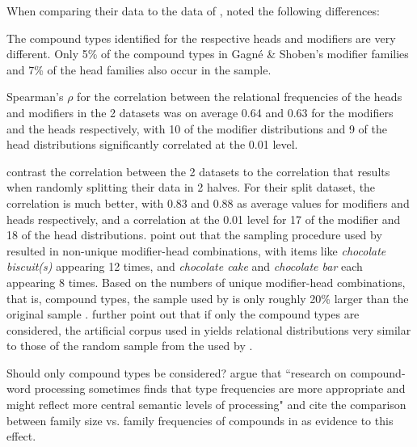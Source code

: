 When comparing their data to the data of \citet{GagneandShoben:1997},
\citet{Maguireetal:2007} noted the following differences:
\begin{inparaenum}[(1)]
\item The compound types identified for the
respective heads and modifiers are very different. Only 5\% of the
compound types in Gagné \& Shoben's modifier families and 7\% of the
head families also  occur in the  sample.
\item Spearman's $\rho$ for the correlation between the relational frequencies of the heads and modifiers
in the 2 datasets was on average 0.64 and 0.63 for the modifiers and
the heads respectively, with 10 of the modifier distributions and 9
of the head distributions significantly correlated at the 0.01
level. 
\end{inparaenum}
\citet{Maguireetal:2007} contrast the correlation between the 2
datasets to the correlation that results when randomly splitting their
 data in 2 halves. For their split dataset, the
correlation is much better, with 0.83 and 0.88 as average values for
modifiers and heads respectively, and a correlation at the 0.01 level
for 17 of the modifier and 18 of the head
distributions. \citet{SpaldingandGagne:2008} point out that the
sampling procedure used by \citet{Maguireetal:2007} resulted in
non-unique modifier-head combinations, with items like \emph{chocolate biscuit(s)} appearing 12 times, and \emph{chocolate cake} and \emph{chocolate bar} each appearing 8
times. Based on the numbers of unique modifier-head
combinations, that is, compound types, the
sample used by \citet{Maguireetal:2007} is only roughly 20\% larger %
than the original \citet{GagneandShoben:1997}
sample \citep[1576]{SpaldingandGagne:2008}.
\citet{SpaldingandGagne:2008} further point out that if only the
compound types are considered, the artificial corpus used in
\citet{GagneandShoben:1997} yields relational distributions very
similar to those of the random sample from the  used by
\citet{Maguireetal:2007}. 

Should only compound types be considered? 
\citet[1577]{SpaldingandGagne:2008} argue that ``research on
compound-word processing sometimes finds that type frequencies
are more appropriate and might reflect more central semantic
levels of processing" and cite the comparison between family size
vs. family frequencies of compounds in \citet{deJongetal:2000} as
evidence to this effect. 

